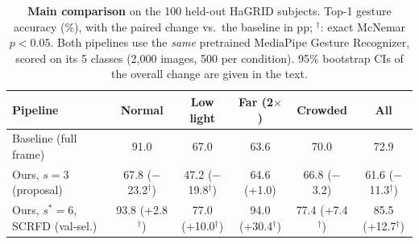 \begin{table}[t]
\centering
\small
\setlength{\tabcolsep}{6pt}
\begin{tabular}{lccccc}
\toprule
Pipeline & Normal & Low light & Far (2$\times$) & Crowded & All \\
\midrule
Baseline (full frame) & 91.0 & 67.0 & 63.6 & 70.0 & 72.9 \\
Ours, $s{=}3$ (proposal) & 67.8 {\scriptsize($-$23.2$^\dagger$)} & 47.2 {\scriptsize($-$19.8$^\dagger$)} & 64.6 {\scriptsize(+1.0)} & 66.8 {\scriptsize($-$3.2)} & 61.6 {\scriptsize($-$11.3$^\dagger$)} \\
Ours, $s^*{=}6$, SCRFD (val-sel.) & 93.8 {\scriptsize(+2.8$^\dagger$)} & 77.0 {\scriptsize(+10.0$^\dagger$)} & 94.0 {\scriptsize(+30.4$^\dagger$)} & 77.4 {\scriptsize(+7.4$^\dagger$)} & 85.5 {\scriptsize(+12.7$^\dagger$)} \\
\bottomrule
\end{tabular}
\vspace{-1mm}
\caption{\textbf{Main comparison} on the 100 held-out HaGRID subjects. Top-1 gesture accuracy (\%), with the paired change vs.\ the baseline in pp; $^\dagger$: exact McNemar $p<0.05$. Both pipelines use the \emph{same} pretrained MediaPipe Gesture Recognizer, scored on its 5 classes (2,000 images, 500 per condition). 95\% bootstrap CIs of the overall change are given in the text.}
\label{tab:main}
\vspace{-2mm}
\end{table}